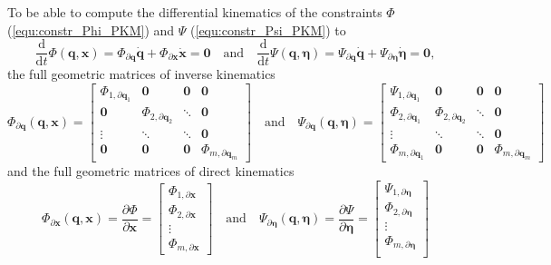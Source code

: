 \documentclass[robotics,article,submit,moreauthors,pdftex]{Definitions/mdpi}
\newcommand{\bm}[1]{\boldsymbol{#1}}
\let\Phi\varPhi
\let\Psi\varPsi
\begin{document}
To be able to compute the differential kinematics of the constraints $\bm{\Phi}$ (\ref{equ:constr_Phi_PKM}) and  $\bm{\Psi}$ (\ref{equ:constr_Psi_PKM}) to
%
\begin{equation}
\frac{\mathrm{d}}{{\mathrm{d}}t} \bm{\Phi}(\bm{q},\bm{x})
=
\bm{\Phi}_{\partial \bm{q}}  \dot{\bm{q}}
+
\bm{\Phi}_{\partial \bm{x}} \dot{\bm{x}}
=
\bm{0}
\quad
\mathrm{and}
\quad
\frac{\mathrm{d}}{{\mathrm{d}}t} \bm{\Psi}(\bm{q},\bm{\eta})
=
\bm{\Psi}_{\partial \bm{q}}  \dot{\bm{q}}
+
\bm{\Psi}_{\partial \bm{\eta}} \dot{\bm{\eta}}
=
\bm{0},
\label{equ:constr_diff}
\end{equation}
%
the full geometric matrices of inverse kinematics
%
\begin{equation}
\bm{\Phi}_{\partial \bm{q}}(\bm{q},\bm{x})
=
\begin{bmatrix}
\bm{\Phi}_{1,\partial\bm{q}_1}  & \bm{0} & \bm{0} & \bm{0}\\
\bm{0} & \bm{\Phi}_{2,\partial\bm{q}_2} & \ddots & \bm{0}  \\
\vdots & \ddots & \ddots & \bm{0}  \\
\bm{0} & \bm{0} & \bm{0} &\bm{\Phi}_{m,\partial\bm{q}_m}
\end{bmatrix}
\quad
\mathrm{and}
\quad
\bm{\Psi}_{\partial \bm{q}}(\bm{q},\bm{\eta})
=
\begin{bmatrix}
\bm{\Psi}_{1,\partial\bm{q}_1}  & \bm{0} & \bm{0} & \bm{0}\\
\bm{\Phi}_{2,\partial\bm{q}_1} & \bm{\Phi}_{2,\partial\bm{q}_2} & \ddots & \bm{0}  \\
\vdots & \ddots & \ddots & \bm{0}  \\
\bm{\Phi}_{m,\partial\bm{q}_1} & \bm{0} & \bm{0} &\bm{\Phi}_{m,\partial\bm{q}_m}
\end{bmatrix}
\label{equ:PhiPsi_grad_q_complete}
\end{equation}
%
and the full geometric matrices of direct kinematics
%
\begin{equation}
\bm{\Phi}_{\partial \bm{x}}(\bm{q},\bm{x})
=
\frac{\partial \bm{\Phi}}{\partial \bm{x}}
=
\begin{bmatrix}
\bm{\Phi}_{1,\partial\bm{x}} \\
\bm{\Phi}_{2,\partial\bm{x}} \\
\vdots \\
\bm{\Phi}_{m,\partial\bm{x}}
\end{bmatrix}
\quad
\mathrm{and}
\quad
\bm{\Psi}_{\partial \bm{\eta}}(\bm{q},\bm{\eta})
=
\frac{\partial \bm{\Psi}}{\partial \bm{\eta}}
=
\begin{bmatrix}
\bm{\Psi}_{1,\partial\bm{\eta}} \\
\bm{\Phi}_{2,\partial\bm{\eta}} \\
\vdots \\
\bm{\Phi}_{m,\partial\bm{\eta}} \\
\end{bmatrix}
\label{equ:PhiPsi_grad_x_complete}
\end{equation}
\end{document}
